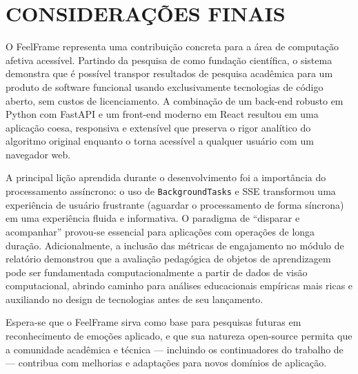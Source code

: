 \documentclass[
	12pt,
	openright,
	oneside,
	a4paper,
	english,
	brazil
	]{abntex2}
\begin{document}
\section{CONSIDERAÇÕES FINAIS}

O FeelFrame representa uma contribuição concreta para a área de computação afetiva acessível. Partindo da pesquisa de \cite{nascimento2024nelson} como fundação científica, o sistema demonstra que é possível transpor resultados de pesquisa acadêmica para um produto de software funcional usando exclusivamente tecnologias de código aberto, sem custos de licenciamento. A combinação de um back-end robusto em Python com FastAPI e um front-end moderno em React resultou em uma aplicação coesa, responsiva e extensível que preserva o rigor analítico do algoritmo original enquanto o torna acessível a qualquer usuário com um navegador web.

A principal lição aprendida durante o desenvolvimento foi a importância do processamento assíncrono: o uso de \texttt{BackgroundTasks} e SSE transformou uma experiência de usuário frustrante (aguardar o processamento de forma síncrona) em uma experiência fluida e informativa. O paradigma de ``disparar e acompanhar'' provou-se essencial para aplicações com operações de longa duração. Adicionalmente, a inclusão das métricas de engajamento no módulo de relatório demonstrou que a avaliação pedagógica de objetos de aprendizagem pode ser fundamentada computacionalmente a partir de dados de visão computacional, abrindo caminho para análises educacionais empíricas mais ricas e auxiliando no design de tecnologias antes de seu lançamento.

Espera-se que o FeelFrame sirva como base para pesquisas futuras em reconhecimento de emoções aplicado, e que sua natureza open-source permita que a comunidade acadêmica e técnica --- incluindo os continuadores do trabalho de \cite{nascimento2024nelson} --- contribua com melhorias e adaptações para novos domínios de aplicação.

\postextual



\end{document}
